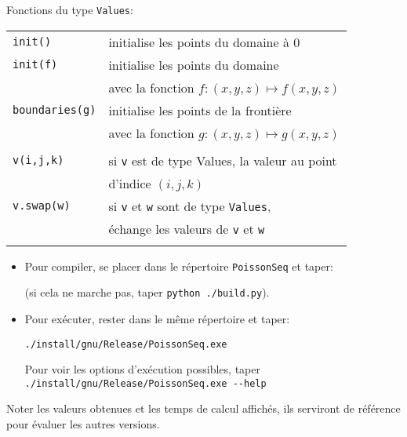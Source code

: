 \documentclass{beamer}
\begin{document}
\begin{frame}
Fonctions du type {\tt Values}:
\bigskip

\begin{tabular}{ll}
	{\tt init()} & initialise les points du domaine à 0 \\
	{\tt init(f)}& initialise les points du domaine \\ & avec la fonction $f : (x,y,z) \mapsto f(x,y,z)$\\
	{\tt boundaries(g)} & initialise les points de la frontière \\ &  avec la fonction $g: (x,y,z) \mapsto g(x,y,z)$\\ \\
	{\tt v(i,j,k)}& si {\tt v} est de type {Values}, la valeur au point \\ &  d'indice $(i,j,k)$ \\
	{\tt v.swap(w)} & si {\tt v} et {\tt w} sont de type {\tt Values}, \\ & échange les valeurs de {\tt v} et {\tt w} \\ \\
\end{tabular}

\end{frame}

\begin{frame}[fragile]
\vfill

	
\begin{itemize}
\item 	Pour compiler, se placer dans le répertoire {\tt PoissonSeq} et taper:

		
\vfill
		(si cela ne marche pas, taper \verb|python ./build.py|).
		
\vfill
	\item Pour exécuter, rester dans le même répertoire et taper:

\hspace{2cm}
{\color{blue}\begin{verbatim}
./install/gnu/Release/PoissonSeq.exe
\end{verbatim}
}

\vfill
Pour voir les options d'exécution possibles, taper \verb|./install/gnu/Release/PoissonSeq.exe --help|
\end{itemize}

\vfill
Noter les valeurs obtenues et les temps de calcul affichés, ils serviront de référence pour évaluer les autres versions. 
\vfill
\end{frame}
\end{document}
